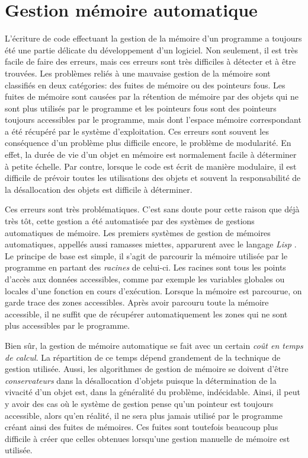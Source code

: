 \documentclass[12pt,twoside,letterpaper,francais]{book}
\newcommand{\lisp}{{\textit{Lisp }}}
\begin{document}
\FloatBarrier
\section{Gestion mémoire automatique}
L'écriture de code effectuant la gestion de la mémoire d'un programme
a toujours été une partie délicate du développement d'un logiciel. Non
seulement, il est très facile de faire des erreurs, mais ces erreurs
sont très difficiles à détecter et à être trouvées. Les problèmes
reliés à une mauvaise gestion de la mémoire sont classifiés en deux
catégories: des fuites de mémoire ou des pointeurs fous. Les fuites de
mémoire sont causées par la rétention de mémoire par des objets qui ne
sont plus utilisés par le programme et les pointeurs fous sont des
pointeurs toujours accessibles par le programme, mais dont l'espace
mémoire correspondant a été récupéré par le système
d'exploitation. Ces erreurs sont souvent les conséquence d'un problème
plus difficile encore, le problème de modularité. En effet, la durée
de vie d'un objet en mémoire est normalement facile à déterminer à
petite échelle. Par contre, lorsque le code est écrit de manière
modulaire, il est difficile de prévoir toutes les utilisations des
objets et souvent la responsabilité de la désallocation des objets est
difficile à déterminer.

Ces erreurs sont très problématiques. C'est sans doute pour cette
raison que déjà très tôt, cette gestion a été automatisée par des
systèmes de gestions automatiques de mémoire. Les premiers systèmes de
gestion de mémoires automatiques, appellés aussi ramasses miettes,
apparurent avec le langage \lisp. Le principe de base est simple, il
s'agit de parcourir la mémoire utilisée par le programme en partant
des \emph{racines} de celui-ci. Les racines sont tous les points
d'accès aux données accessibles, comme par exemple les variables
globales ou locales d'une fonction en cours d'exécution. Lorsque la
mémoire est parcourue, on garde trace des zones accessibles. Après
avoir parcouru toute la mémoire accessible, il ne suffit que de
récupérer automatiquement les zones qui ne sont plus accessibles par
le programme.

Bien sûr, la gestion de mémoire automatique se fait avec un certain
\emph{coût en temps de calcul}. La répartition de ce temps dépend
grandement de la technique de gestion utilisée. Aussi, les algorithmes
de gestion de mémoire se doivent d'être \emph{conservateurs} dans la
désallocation d'objets puisque la détermination de la vivacité d'un
objet est, dans la généralité du problème, indécidable. Ainsi, il peut
y avoir des cas où le système de gestion pense qu'un pointeur est
toujours accessible, alors qu'en réalité, il ne sera plus jamais
utilisé par le programme créant ainsi des fuites de mémoires. Ces
fuites sont toutefois beaucoup plus difficile à créer que celles
obtenues lorsqu'une gestion manuelle de mémoire est utilisée.
\end{document}
